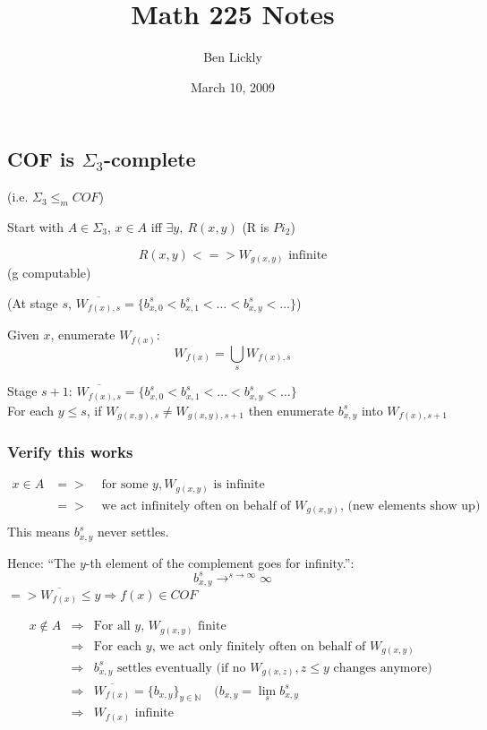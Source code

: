 \documentclass[12pt]{article}
\author{Ben Lickly}
\date{March 10, 2009}
\title{Math 225 Notes}
\newcommand{\Nat}{\ensuremath{\mathbb{N}}}
\newcommand{\Conj}[1]{\ensuremath{\overline{#1}}}
\begin{document}
\maketitle

\subsection*{COF is $\Sigma_3$-complete}
(i.e. $\Sigma_3 \le_m COF$)

Start with $A \in \Sigma_3$, $x \in A $ iff $\exists y,\ R(x,y)$ (R is $Pi_2$)

\[
 R(x,y) <=> W_{g(x,y)} \text{ infinite}
\]
(g computable)

(At stage $s$,
$
 \Conj{W_{f(x),s}} = \{ b^s_{x,0} < b^s_{x,1} < \ldots < b^s_{x,y} < \ldots \}
$)

Given $x$, enumerate $W_{f(x)}$:
\[
 W_{f(x)} = \bigcup_s W_{f(x),s}
\]                      %

Stage $s+1$:  $\Conj{W_{f(x),s}} = \{ b^s_{x,0} < b^s_{x,1} < \ldots < b^s_{x,y} < \ldots \}$ \\

For each $y \le s$,
if $W_{g(x,y),s} \ne W_{g(x,y),s+1}$
then enumerate $b^s_{x,y}$ into $W_{f(x),s+1}$


\subsubsection*{Verify this works}

\begin{align*}
 x \in A &=>& \text{ for some } y, W_{g(x,y)} \text{ is infinite} \\
 &=>& \text{ we act infinitely often on behalf of $W_{g(x,y)}$, (new elements show up)} \\
\end{align*}
This means $b^s_{x,y}$ never settles.

Hence: ``The $y$-th element of the complement goes for infinity.'':
\[
 b^s_{x,y} \rightarrow^{s \rightarrow \infty} \infty
\]
$=> \Conj{W_{f(x)}} \le y \Rightarrow f(x) \in COF$

\begin{align*}
 x \not\in A &\Rightarrow& \text{For all $y$, $W_{g(x,y)}$ finite} \\
  &\Rightarrow& \text{For each $y$, we act only finitely often on behalf of $W_{g(x,y)}$} \\
  &\Rightarrow& b^s_{x,y} \text{ settles eventually 
		(if no $W_{g(x,z)}, z \le y$ changes anymore) } \\
  &\Rightarrow& \Conj{W_{f(x)}} = \{ b_{x,y} \}_{y \in \Nat} \quad ( b_{x,y} = \lim_s b^s_{x,y} \\
  &\Rightarrow& W_{f(x)} \text{ infinite} \\
\end{align*}
\end{document}
